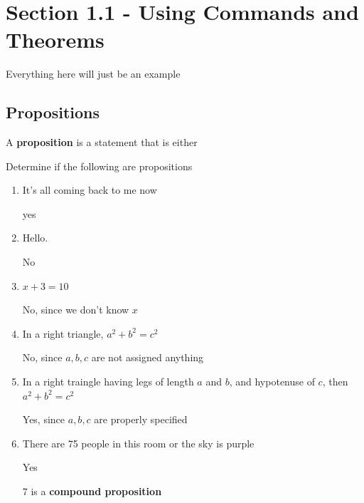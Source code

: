 \documentclass[../../Main.tex]{subfiles}
\begin{document}
\section{Section 1.1 - Using Commands and Theorems}

Everything here will just be an example

\subsection{Propositions}

\begin{definition}[Proposition]
    A \textbf{proposition} is a statement that is either 
\end{definition}

\begin{example}
    Determine if the following are propositions

    \begin{enumerate}
        \item It's all coming back to me now
            \begin{solution}
                yes
            \end{solution}

        \item Hello.
            \begin{solution}
                No
            \end{solution}

        \item $x + 3 = 10$
            \begin{solution}
                No, since we don't know $x$
            \end{solution}

        \item In a right triangle, $a^2 + b^2 = c^2$
            \begin{solution}
                No, since $a, b, c$ are not assigned anything
            \end{solution}

        \item In a right traingle having legs of length $a$ and $b$, and hypotenuse of $c$, then $a^2 + b^2 = c^2$
            \begin{solution}
                Yes, since $a,b,c$ are properly specified
            \end{solution}

        \item There are 75 people in this room or the sky is purple
            \begin{solution}
                Yes
            \end{solution}
            
        \begin{note}
            7 is a \textbf{compound proposition}
        \end{note}

    \end{enumerate}
\end{example}
\end{document}
